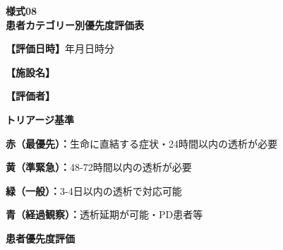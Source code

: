 \documentclass[a4paper,12pt]{jarticle}
\newcommand{\underlinespace}[1]{\underline{\hspace{#1}}}
\begin{document}
\begin{center}
{\Large\textbf{様式08}}\\
\vspace{3mm}
{\Large\textbf{患者カテゴリー別優先度評価表}}
\end{center}
\vspace{5mm}

\noindent
\textbf{【評価日時】}\underlinespace{2cm}年\underlinespace{1cm}月\underlinespace{1cm}日\underlinespace{1cm}時\underlinespace{1cm}分

\vspace{3mm}

\noindent
\textbf{【施設名】} \underlinespace{10cm}

\vspace{3mm}

\noindent
\textbf{【評価者】} \underlinespace{10cm}

\vspace{8mm}

\begin{center}
\textbf{\large トリアージ基準}
\end{center}

\vspace{3mm}

\noindent
\textbf{赤（最優先）：}生命に直結する症状・24時間以内の透析が必要

\vspace{2mm}

\noindent
\textbf{黄（準緊急）：}48-72時間以内の透析が必要

\vspace{2mm}

\noindent
\textbf{緑（一般）：}3-4日以内の透析で対応可能

\vspace{2mm}

\noindent
\textbf{青（経過観察）：}透析延期が可能・PD患者等

\vspace{8mm}

\begin{center}
\textbf{\large 患者優先度評価}
\end{center}

\vspace{3mm}
\end{document}
